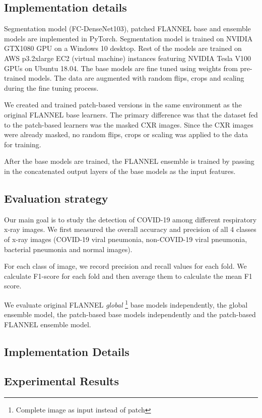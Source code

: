 \documentclass{sigkddExp}
\begin{document}
\subsection{Implementation details}
Segmentation model (FC-DenseNet103), patched FLANNEL base and ensemble models
are implemented in PyTorch. Segmentation model is trained on NVIDIA GTX1080 GPU
on a Windows 10 desktop. Rest of the models are trained on AWS p3.2xlarge EC2
(virtual machine) instances featuring NVIDIA Tesla V100 GPUs on Ubuntu 18.04.
The base models are fine tuned using weights from pre-trained
models. The data are augmented with random flips, crops and scaling during the
fine tuning process.

We created and trained patch-based versions in the same environment as the
original FLANNEL base learners. The primary difference was that the dataset fed
to the patch-based learners was the masked CXR images. Since the CXR images were
already masked, no random flips, crops or scaling was applied to the data for
training.

After the base models are trained, the FLANNEL ensemble is trained by passing in
the concatenated output layers of the base models as the input features.


\subsection{Evaluation strategy}
Our main goal is to study the detection of COVID-19 among different respiratory
x-ray images. We first measured the overall accuracy and precision of all 4
classes of x-ray images (COVID-19 viral pneumonia, non-COVID-19 viral pneumonia,
bacterial pneumonia and normal images).

For each class of image, we record precision and recall values for each fold.
We calculate F1-score for each fold and then average them to calculate the mean
F1 score.

We evaluate original FLANNEL \textit{global} \footnote{Complete image as input
instead of patch} base models independently, the global ensemble model, the
patch-based base models independently and the patch-based FLANNEL ensemble model.

\subsection{Implementation Details}


\subsection{Experimental Results}
\end{document}
